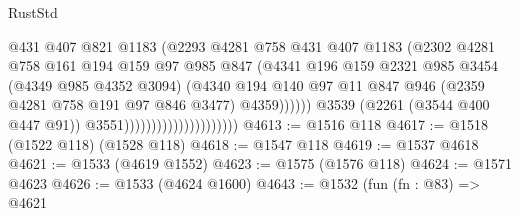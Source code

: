 \begin{lexlean}{RustStd}
\begin{coremodule}
                                                  @431
                                                  @407
                                                  @821
                                                  @1183
                                                  (@2293
                                                    @4281
                                                    @758
                                                    @431
                                                    @407
                                                    @1183
                                                    (@2302
                                                      @4281
                                                      @758
                                                      @161
                                                      @194
                                                      @159
                                                      @97
                                                      @985
                                                      @847
                                                      (@4341
                                                        @196
                                                        @159
                                                        @2321
                                                        @985
                                                        @3454
                                                        (@4349 @985 @4352 @3094)
                                                        (@4340
                                                          @194
                                                          @140
                                                          @97
                                                          @11
                                                          @847
                                                          @946
                                                          (@2359 @4281 @758 @191 @97 @846 @3477)
                                                          @4359))))))
                                              @3539
                                              (@2261 (@3544 @400 @447 @91))
                                              @3551)))))))))))))))))))))
@4613 := @1516 @118
@4617 := @1518 (@1522 @118) (@1528 @118)
@4618 := @1547 @118
@4619 := @1537 @4618
@4621 := @1533 (@4619 @1552)
@4623 := @1575 (@1576 @118)
@4624 := @1571 @4623
@4626 := @1533 (@4624 @1600)
@4643 := @1532
    (fun (fn : @83) =>
    @4621

\end{coremodule}
\end{lexlean}
